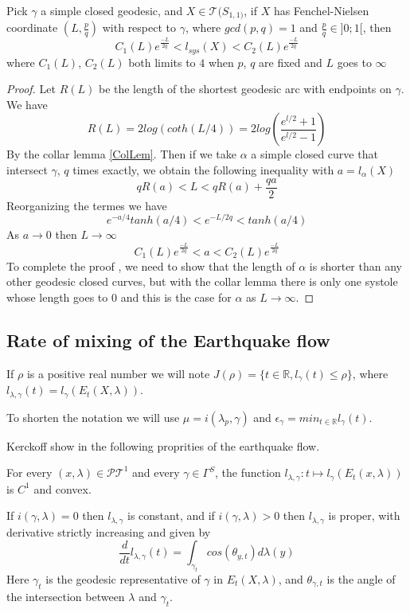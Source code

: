 \begin{lem}
Pick $\gamma$ a simple closed geodesic, and $X \in \mathcal{T}(S_{1,1)}$, if $X$ has Fenchel-Nielsen coordinate $(L,\frac{p}{q})$ with respect to $\gamma$, where $gcd(p,q)=1$ and $\frac{p}{q} \in ]0;1[$, then \[
C_1(L) e^{\frac{-L}{2q}} < l_{sys}(X) < C_2(L) e^{\frac{-L}{2q}}
\]
where $C_1(L)$, $C_2(L)$ both limits to $4$ when $p$, $q$ are fixed and $L$ goes to $\infty$
\end{lem}

\begin{proof}
Let $R(L)$ be the length of the shortest geodesic arc with endpoints on $\gamma$. We have \[
R(L)= 2 log(coth(L/4))=2 log(\frac{e^{l/2}+1}{e^{l/2}-1})
\]
By the collar lemma \ref{ColLem}.
Then if we take $\alpha$ a simple closed curve that intersect $\gamma$, $q$ times exactly, we obtain the following inequality with $a=l_\alpha(X)$ \[
q R(a) < L < q R(a) + \frac{qa}{2}
\]
Reorganizing the termes we have \[
e^{-a/4}tanh(a/4) < e^{-L/2q} < tanh(a/4)
\]
As $a \rightarrow 0$ then $L \rightarrow \infty$
\[
C_1(L) e^{\frac{-L}{2q}} < a < C_2(L) e^{\frac{-L}{2q}}
\]
To complete the proof , we need to show that the length of $\alpha$ is shorter than any other geodesic closed curves, but with the collar lemma there is only one systole whose length goes to $0$ and this is the case for $\alpha$ as $L \rightarrow \infty$.

\end{proof}

\subsection{Rate of mixing of the Earthquake flow}

If $\rho$ is a positive real number we will note $J(\rho)= \{t \in \mathbb{R} , l_\gamma(t) \leq \rho \}$, where $l_{\lambda,\gamma}(t)=l_{\gamma}(E_t(X,\lambda))$.

To shorten the notation we will use $\mu=i(\lambda_p,\gamma)$ and $\epsilon_\gamma = min_{t \in \mathbb{R}} l_\gamma (t)$.


Kerckoff show in \cite{NielsenRealizationPr} the following proprities of the earthquake flow.

\begin{prop}
For every $(x,\lambda) \in \mathcal{PT}^1$ and every $\gamma \in \Gamma^S$, the function $l_{\lambda,\gamma}: t \mapsto l_\gamma(E_t(x,\lambda))$ is $C^1$ and convex.

If $i(\gamma,\lambda)=0$ then $l_{\lambda,\gamma}$ is constant, and if $i(\gamma,\lambda)>0$ then $l_{\lambda,\gamma}$ is proper, with derivative strictly increasing and given by \begin{equation}
\frac{d}{dt}l_{\lambda,\gamma}(t)= \int_{\gamma_t}cos(\theta_{y,t})d \lambda(y)
\end{equation}
Here $\gamma_t$ is the geodesic representative of $\gamma$ in $E_t(X,\lambda)$, and $\theta_{\gamma,t}$ is the angle of the intersection between $\lambda$ and $\gamma_t$.
\end{prop}

